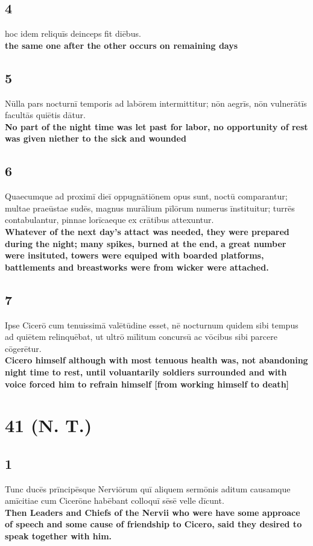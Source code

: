 \documentclass{article}
\begin{document}
\subsection*{4}
hoc idem reliquīs deinceps fit diēbus.\\
\textbf{the same one after the other occurs on remaining days}

\subsection*{5}
Nūlla pars nocturnī temporis ad labōrem intermittitur; nōn aegrīs, nōn vulnerātīs facultās quiētis dātur. \\
\textbf{No part of the night time was let past for labor, no opportunity of rest was given niether to the sick and wounded}


\subsection*{6}
Quaecumque ad proximī dieī oppugnātiōnem opus sunt, noctū comparantur; multae praeūstae sudēs, magnus murālium pīlōrum numerus īnstituitur; turrēs contabulantur, pinnae lorīcaeque ex crātibus attexuntur. \\
\textbf{Whatever of the next day's attact was needed, they were prepared during the night; many spikes, burned at the end, a great number were insituted, towers were equiped with boarded platforms, battlements and breastworks were from wicker were attached.}


\subsection*{7}
Ipse Cicerō cum tenuissimā valētūdine esset, nē nocturnum quidem sibi tempus ad quiētem relinquēbat, ut ultrō mīlitum concursū ac vōcibus sibi parcere cōgerētur.\\
\textbf{Cicero himself although with most tenuous health was, not abandoning night time to rest, until voluantarily soldiers surrounded and with voice forced him to refrain himself [from working himself to death]}

\break

\section*{41 (N. T.)}


\subsection*{1}
Tunc ducēs prīncipēsque Nerviōrum quī aliquem sermōnis aditum causamque amīcitiae cum Cicerōne habēbant colloquī sēsē velle dīcunt.\\
\textbf{Then Leaders and Chiefs of the Nervii who were have some approace of speech and some cause of friendship to Cicero, said they desired to speak together with him.}
\end{document}

